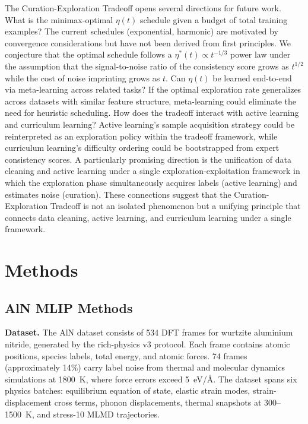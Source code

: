 \documentclass{article}
\begin{document}
The Curation-Exploration Tradeoff opens several directions for future work. What is the minimax-optimal $\eta(t)$ schedule given a budget of total training examples? The current schedules (exponential, harmonic) are motivated by convergence considerations but have not been derived from first principles. We conjecture that the optimal schedule follows a $\eta^*(t) \propto t^{-1/3}$ power law under the assumption that the signal-to-noise ratio of the consistency score grows as $t^{1/2}$ while the cost of noise imprinting grows as $t$. Can $\eta(t)$ be learned end-to-end via meta-learning across related tasks? If the optimal exploration rate generalizes across datasets with similar feature structure, meta-learning could eliminate the need for heuristic scheduling. How does the tradeoff interact with active learning and curriculum learning? Active learning's sample acquisition strategy could be reinterpreted as an exploration policy within the tradeoff framework, while curriculum learning's difficulty ordering could be bootstrapped from expert consistency scores. A particularly promising direction is the unification of data cleaning and active learning under a single exploration-exploitation framework in which the exploration phase simultaneously acquires labels (active learning) and estimates noise (curation). These connections suggest that the Curation-Exploration Tradeoff is not an isolated phenomenon but a unifying principle that connects data cleaning, active learning, and curriculum learning under a single framework.

\section{Methods}
\label{sec:methods}

\subsection{AlN MLIP Methods}
\label{sec:methods_aln}

\textbf{Dataset.} The AlN dataset consists of 534 DFT frames for wurtzite aluminium nitride, generated by the rich-physics v3 protocol. Each frame contains atomic positions, species labels, total energy, and atomic forces. 74 frames (approximately 14\%) carry label noise from thermal and molecular dynamics simulations at 1800~K, where force errors exceed 5~eV/\AA. The dataset spans six physics batches: equilibrium equation of state, elastic strain modes, strain-displacement cross terms, phonon displacements, thermal snapshots at 300--1500~K, and stress-10 MLMD trajectories.
\end{document}
